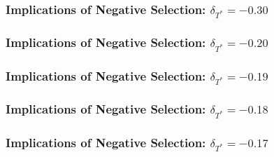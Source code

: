 \documentclass{beamer}
\begin{document}
\begin{frame}[noframenumbering]
  \frametitle{Implications of Negative Selection: $\delta_{T^*} = -0.30$}
\begin{figure}[h]
  \scriptsize
  \begingroup
  \centering
  
  \endgroup
\end{figure}
\end{frame}
\begin{frame}[noframenumbering]
  \frametitle{Implications of Negative Selection: $\delta_{T^*} = -0.20$}
\begin{figure}[h]
  \scriptsize
  \begingroup
  \centering
  
  \endgroup
\end{figure}
\end{frame}
\begin{frame}[noframenumbering]
  \frametitle{Implications of Negative Selection: $\delta_{T^*} = -0.19$}
\begin{figure}[h]
  \scriptsize
  \begingroup
  \centering
  
  \endgroup
\end{figure}
\end{frame}
\begin{frame}[noframenumbering]
  \frametitle{Implications of Negative Selection: $\delta_{T^*} = -0.18$}
\begin{figure}[h]
  \scriptsize
  \begingroup
  \centering
  
  \endgroup
\end{figure}
\end{frame}
\begin{frame}[noframenumbering]
  \frametitle{Implications of Negative Selection: $\delta_{T^*} = -0.17$}
\begin{figure}[h]
  \scriptsize
  \begingroup
  \centering
  
  \endgroup
\end{figure}
\end{frame}
\end{document}
